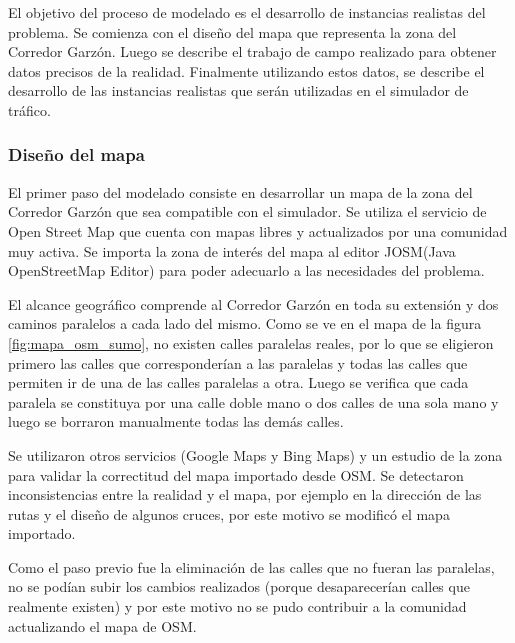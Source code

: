 El objetivo del proceso de modelado es el desarrollo de instancias realistas del problema. Se comienza con el diseño del mapa que representa la zona del Corredor Garzón. Luego se describe el trabajo de campo realizado para obtener datos precisos de la realidad. Finalmente utilizando estos datos, se describe el desarrollo de las instancias realistas que serán utilizadas en el simulador de tráfico.

\subsubsection{Diseño del mapa}

El primer paso del modelado consiste en desarrollar un mapa de la zona del Corredor Garzón que sea compatible con el simulador. Se utiliza el servicio de Open Street Map \citep{OSM} que cuenta con mapas libres y actualizados por una comunidad muy activa. Se importa la zona de interés del mapa al editor JOSM(Java OpenStreetMap Editor) para poder adecuarlo a las necesidades del problema. 


El alcance geográfico comprende al Corredor Garzón en toda su extensión y dos caminos paralelos a cada lado del mismo.
Como se ve en el mapa de la figura \ref{fig:mapa_osm_sumo}, no existen calles paralelas reales, por lo que se eligieron primero las calles que corresponderían a las paralelas y todas las calles que permiten ir de una de las calles paralelas a otra. Luego se verifica que cada paralela se constituya por una calle doble mano o dos calles de una sola mano y luego se borraron manualmente todas las demás calles.

Se utilizaron otros servicios (Google Maps y Bing Maps) y un estudio de la zona para validar la correctitud del mapa importado desde OSM. Se detectaron inconsistencias entre la realidad y el mapa, por ejemplo en la dirección de las rutas y el diseño de algunos cruces, por este motivo se modificó el mapa importado.  

Como el paso previo fue la eliminación de las calles que no fueran las paralelas, no se podían subir los cambios realizados (porque desaparecerían calles que realmente existen) y por este motivo no se pudo contribuir a la comunidad actualizando el mapa de OSM.


